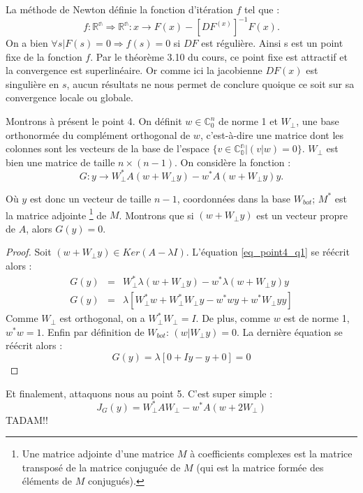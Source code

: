 La méthode de Newton définie la fonction d'itération $f$ tel que : $$f:\mathbb{R^n} \Rightarrow \mathbb{R^n} : x \rightarrow F(x)-[DF^(x)]^{-1}F(x). $$
On a bien $\forall s | F(s)=0 \Longrightarrow f(s)=0$ si $DF$ est régulière. Ainsi s est un point fixe de la fonction $f$. Par le théorème 3.10 du cours, ce point fixe est attractif et la convergence est superlinéaire. Or comme ici la jacobienne $DF(x)$ est singulière en $s$, aucun résultats ne nous permet de conclure quoique ce soit sur sa convergence locale ou globale.


Montrons à présent le point 4. On définit $w \in \mathbb{C}_0^n$ de norme 1 et $W_{\bot}$, une base orthonormée du complément orthogonal de $w$, c'est-à-dire une matrice dont les colonnes sont les vecteurs de la base de l'espace $ \lbrace v\in \mathbb{C^n_0} | (v|w)=0 \rbrace$. $W_{\bot}$ est bien une matrice de taille $n \times (n-1)$. On considère la fonction : 
\begin{equation} \label{eq_point4_q1}
 G:y \rightarrow W_{\bot}^* A(w+ W_{\bot}y) - w^*A(w+ W_{\bot}y)y.
\end{equation}

Où $y$ est donc un vecteur de taille $n-1$, coordonnées dans la base $W_{bot}$; $M^*$ est la matrice adjointe \footnote{Une matrice adjointe d'une matrice $M$ à coefficients complexes est la matrice transposé de la matrice conjuguée de $M$ (qui est la matrice formée des éléments de $M$ conjugués).} de $M$.
Montrons que si $(w+ W_{\bot}y)$ est un vecteur propre de $A$, alors $G(y)=0$.
\begin{proof}
Soit $(w+ W_{\bot}y) \in Ker(A-\lambda I)$. L'équation \ref{eq_point4_q1} se réécrit alors : 
\begin{eqnarray}
G(y) &=& W_{\bot}^* \lambda (w+ W_{\bot}y) - w^*\lambda (w+ W_{\bot}y)y\\
G(y) &=& \lambda [W_{\bot}^* w + W_{\bot}^*W_{\bot}y - w^* wy + w^* W_{\bot}yy ] 
\end{eqnarray}
Comme $W_{\bot}$ est orthogonal, on a $W_{\bot}^* W_{\bot} = I$. De plus, comme $w$ est de norme 1, $w^* w=1$. Enfin par définition de $W_{bot}$: $(w| W_{\bot}y)=0$. La dernière équation se réécrit alors : 
$$G(y) = \lambda [0 + Iy - y + 0] = 0 $$
\end{proof}


Et finalement, attaquons nous au point 5. C'est super simple : 
$$J_G(y) = W^*_{\bot}AW_{\bot} - w^*A(w + 2W_{\bot}) $$
TADAM!! 

















 